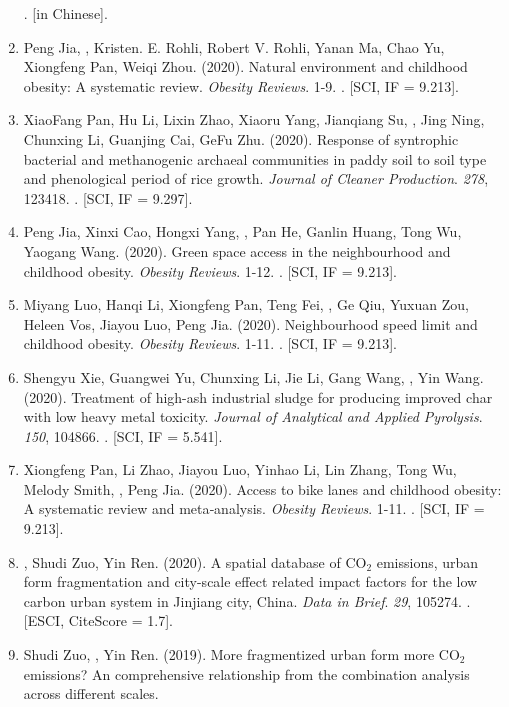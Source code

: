 \begin{enumerate}
    . [in Chinese].
\item
    Peng Jia, \Shaoqing, Kristen. E. Rohli, Robert V. Rohli, Yanan Ma, Chao Yu, Xiongfeng Pan, Weiqi Zhou. (2020).
    Natural environment and childhood obesity: A systematic review.
    \textit{Obesity Reviews}. 1-9.
    . [SCI, IF = 9.213].
\item
    XiaoFang Pan, Hu Li, Lixin Zhao, Xiaoru Yang, Jianqiang Su, \Shaoqing, Jing Ning, Chunxing Li, Guanjing Cai, GeFu Zhu. (2020).
    Response of syntrophic bacterial and methanogenic archaeal communities in paddy soil to soil type and phenological period of rice growth.
    \textit{Journal of Cleaner Production}. \textit{278}, 123418.
    . [SCI, IF = 9.297].
\item
    Peng Jia, Xinxi Cao, Hongxi Yang, \Shaoqing, Pan He, Ganlin Huang, Tong Wu, Yaogang Wang. (2020).
    Green space access in the neighbourhood and childhood obesity.
    \textit{Obesity Reviews}. 1-12.
    . [SCI, IF = 9.213].
\item
    Miyang Luo, Hanqi Li, Xiongfeng Pan, Teng Fei, \Shaoqing, Ge Qiu, Yuxuan Zou, Heleen Vos, Jiayou Luo, Peng Jia. (2020).
    Neighbourhood speed limit and childhood obesity.
    \textit{Obesity Reviews}. 1-11.
    . [SCI, IF = 9.213].
\item
    Shengyu Xie, Guangwei Yu, Chunxing Li, Jie Li, Gang Wang, \Shaoqing, Yin Wang. (2020).
    Treatment of high-ash industrial sludge for producing improved char with low heavy metal toxicity.
    \textit{Journal of Analytical and Applied Pyrolysis}. \textit{150}, 104866.
    . [SCI, IF = 5.541].
\item
    Xiongfeng Pan, Li Zhao, Jiayou Luo, Yinhao Li, Lin Zhang, Tong Wu, Melody Smith, \Shaoqing, Peng Jia. (2020).
    Access to bike lanes and childhood obesity: A systematic review and meta‐analysis.
    \textit{Obesity Reviews}. 1-11.
    . [SCI, IF = 9.213].
\item
    \Shaoqing, Shudi Zuo, Yin Ren. (2020).
    A spatial database of CO$_2$ emissions, urban form fragmentation and city-scale effect related impact factors for the low carbon urban system in Jinjiang city, China.
    \textit{Data in Brief}. \textit{29}, 105274.
    . [ESCI, CiteScore = 1.7].
\item
    Shudi Zuo, \Shaoqing, Yin Ren. (2019).
    More fragmentized urban form more CO$_2$ emissions? An comprehensive relationship from the combination analysis across different scales.

\end{enumerate}
